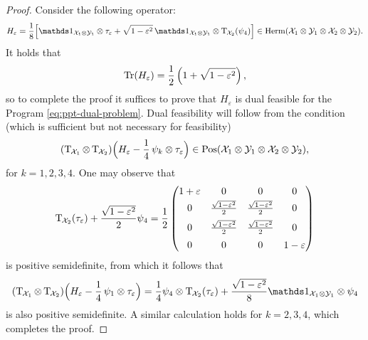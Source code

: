 \begin{proof}

  
  Consider the following operator:
  \begin{equation}
    H_{\varepsilon} = \frac{1}{8}
    \Bigl[
      \I_{\X_1 \otimes \Y_1} \otimes \tau_{\varepsilon}
      + \sqrt{1 - \varepsilon^2}\,
      \I_{\X_1 \otimes \Y_1} \otimes \pt_{\negsmallspace\X_2}(\psi_4)
      \Bigr] \in \Herm(\X_1\otimes\Y_1\otimes\X_2\otimes\Y_2).
  \end{equation}
  It holds that
  \begin{equation}
    \operatorname{Tr}(H_{\varepsilon}) = \frac{1}{2}\left( 1 + \sqrt{1-\varepsilon^2} \right),
  \end{equation}
  so to complete the proof it suffices to prove that $H_{\varepsilon}$ is
  dual feasible for the Program \eqref{eq:ppt-dual-problem}.
  Dual feasibility will follow from the condition (which is sufficient but not necessary for feasibility)
  \begin{equation}
    (\operatorname{T}_{\mspace{-1.5mu}\mathcal{X}_1} \otimes \operatorname{T}_{\mspace{-1.5mu}\mathcal{X}_2})
    \Bigl(
    H_{\varepsilon} - \frac{1}{4}\,\psi_k\otimes\tau_{\varepsilon}\Bigr)
    \in\mathrm{Pos}(\mathcal{X}_1\otimes\mathcal{Y}_1\otimes\mathcal{X}_2\otimes\mathcal{Y}_2),
  \end{equation}
  for $k = 1,2,3,4$.
  One may observe that
  \begin{equation}
    \operatorname{T}_{\mspace{-1.5mu}\mathcal{X}_2}(\tau_{\varepsilon}) 
    + \frac{\sqrt{1-\varepsilon^2}}{2}\psi_4
    = \frac{1}{2}
    \begin{pmatrix}
      1 + \varepsilon & 0 & 0 & 0\\[1mm]
      0 & \frac{\sqrt{1 - \varepsilon^2}}{2} 
      & \frac{\sqrt{1 - \varepsilon^2}}{2} & 0\\[2mm]
      0 & \frac{\sqrt{1 - \varepsilon^2}}{2} 
      & \frac{\sqrt{1 - \varepsilon^2}}{2} & 0\\[2mm]
      0 & 0 & 0 & 1 - \varepsilon
    \end{pmatrix}
  \end{equation}
  is positive semidefinite, from which it follows that
  \begin{equation}
    (\pt_{\negsmallspace\X_1} \otimes \pt_{\negsmallspace\X_2})
    \Bigl(
    H_{\varepsilon} - \frac{1}{4}\,\psi_1\otimes\tau_{\varepsilon}\Bigr)
    = \frac{1}{4} \psi_4 \otimes \pt_{\negsmallspace\X_2}(\tau_{\varepsilon})
    + \frac{\sqrt{1 - \varepsilon^2}}{8} \I_{\X_1\otimes\Y_1} \otimes \psi_4
  \end{equation}
  is also positive semidefinite.
  A similar calculation holds for $k=2,3,4$, which completes the proof.
\end{proof}

